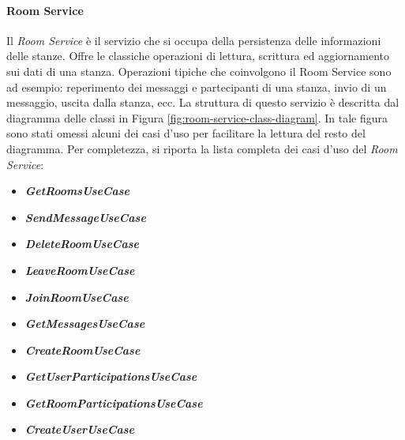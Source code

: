 \paragraph{Room Service}
Il \textit{Room Service} è il servizio che si occupa della persistenza delle informazioni delle stanze. Offre le classiche operazioni di lettura, scrittura ed aggiornamento sui dati di una stanza. Operazioni tipiche che coinvolgono il Room Service sono ad esempio: reperimento dei messaggi e partecipanti di una stanza, invio di un messaggio, uscita dalla stanza, ecc.
La struttura di questo servizio è descritta dal diagramma delle classi in Figura \ref{fig:room-service-class-diagram}.
In tale figura sono stati omessi alcuni dei casi d'uso per facilitare la lettura del resto del diagramma. Per completezza, si riporta la lista completa dei casi d'uso del \textit{Room Service}:
\begin{itemize}
    \item \textbf{\textit{GetRoomsUseCase}}
    \item \textbf{\textit{SendMessageUseCase}}
    \item \textbf{\textit{DeleteRoomUseCase}}
    \item \textbf{\textit{LeaveRoomUseCase}}
    \item \textbf{\textit{JoinRoomUseCase}}
    \item \textbf{\textit{GetMessagesUseCase}}
    \item \textbf{\textit{CreateRoomUseCase}}
    \item \textbf{\textit{GetUserParticipationsUseCase}}
    \item \textbf{\textit{GetRoomParticipationsUseCase}}
    \item \textbf{\textit{CreateUserUseCase}}
\end{itemize}
